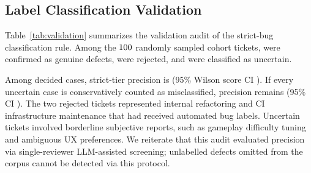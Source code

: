 \subsection{Label Classification Validation}\label{sec:validation}
Table~\ref{tab:validation} summarizes the validation audit of the strict-bug classification rule. Among the $100$ randomly sampled cohort tickets, \valvConf{} were confirmed as genuine defects, \valvRej{} were rejected, and \valvUnc{} were classified as uncertain.



Among decided cases, strict-tier precision is \valvPrec{} (95\% Wilson score CI \valvCI). If every uncertain case is conservatively counted as misclassified, precision remains \valvPrecAll{} (95\% CI \valvCIAll). The two rejected tickets represented internal refactoring and CI infrastructure maintenance that had received automated bug labels. Uncertain tickets involved borderline subjective reports, such as gameplay difficulty tuning and ambiguous UX preferences. We reiterate that this audit evaluated precision via single-reviewer LLM-assisted screening; unlabelled defects omitted from the corpus cannot be detected via this protocol.
